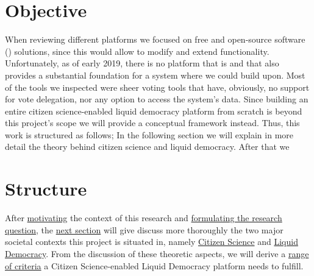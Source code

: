 \section{Objective}
\label{sec:Objective}

When reviewing different platforms we focused on free and open-source software () solutions, since this would allow to modify and extend functionality. Unfortunately, as of early 2019, there is no platform that is  and that also provides a substantial foundation for a  system where we could build upon. Most of the tools we inspected were sheer voting tools that have, obviously, no support for vote delegation, nor any option to access the system’s data. Since building an entire citizen science-enabled liquid democracy platform from scratch is beyond this project’s scope we will provide a conceptual framework instead. Thus, this work is structured as follows; In the following section we will explain in more detail the theory behind citizen science and liquid democracy. After that we  






\section{Structure}
\label{sec:structure}


After \hyperref[sec:Motivation]{motivating} the context of this research and \hyperref[sec:Objective]{formulating the research question}, the \hyperref[ch:Theory]{next section} will give discuss more thoroughly the two major societal contexts this project is situated in, namely \hyperref[sec:Theory_CS]{Citizen Science} and \hyperref[sec:Liquid_Democracy]{Liquid Democracy}. From the discussion of these theoretic aspects, we will derive a \hyperref[sec:Criteria]{range of criteria} a Citizen Science-enabled Liquid Democracy platform needs to fulfill.

